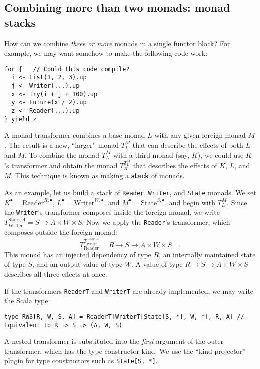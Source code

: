 \subsection{Combining more than two monads: monad stacks\label{subsec:Combining-more-than-monad-stacks}}

How can we combine \emph{three or more} monads in a single functor
block? For example, we may want somehow to make the following code
work:
\begin{lstlisting}
for {   // Could this code compile?
  i <- List(1, 2, 3).up
  j <- Writer(...).up
  x <- Try(i + j + 100).up
  y <- Future(x / 2).up
  z <- Reader(...).up
} yield z
\end{lstlisting}

A monad transformer combines a base monad $L$ with any given foreign
monad $M$. The result is a new, \textsf{``}larger\textsf{''} monad $T_{L}^{M}$ that
can describe the effects of both $L$ and $M$. To combine the monad
$T_{L}^{M}$ with a third monad (say, $K$), we could use $K$\textsf{'}s transformer
and obtain the monad $T_{K}^{T_{L}^{M}}$ that describes the effects
of $K$, $L$, and $M$. This technique is known as making a \textbf{stack}
of monads.

As an example, let us build a stack of \lstinline!Reader!, \lstinline!Writer!,
and \lstinline!State! monads. We set $K^{\bullet}=\text{Reader}^{R,\bullet}$,
$L^{\bullet}=\text{Writer}^{W,\bullet}$, and $M^{\bullet}=\text{State}^{S,\bullet}$,
and begin with $T_{L}^{M}$. Since the \lstinline!Writer!\textsf{'}s transformer
composes inside the foreign monad, we write $T_{\text{Writer}}^{\text{State},A}=S\rightarrow A\times W\times S$.
Now we apply the \lstinline!Reader!\textsf{'}s transformer, which composes
outside the foreign monad:
\[
T_{\text{Reader}}^{T_{\text{Writer}}^{\text{State},A}}=R\rightarrow S\rightarrow A\times W\times S\quad.
\]
This monad has an injected dependency of type $R$, an internally
maintained state of type $S$, and an output value of type $W$. A
value of type $R\rightarrow S\rightarrow A\times W\times S$ describes
all three effects at once.

If the transformers \lstinline!ReaderT! and \lstinline!WriterT!
are already implemented, we may write the Scala type:
\begin{lstlisting}
type RWS[R, W, S, A] = ReaderT[WriterT[State[S, *], W, *], R, A] // Equivalent to R => S => (A, W, S)
\end{lstlisting}
A nested transformer is substituted into the \emph{first} argument
of the outer transformer, which has the type constructor kind. We
use the \textsf{``}kind projector\textsf{''}
plugin for type constructors such as \lstinline!State[S, *]!.

